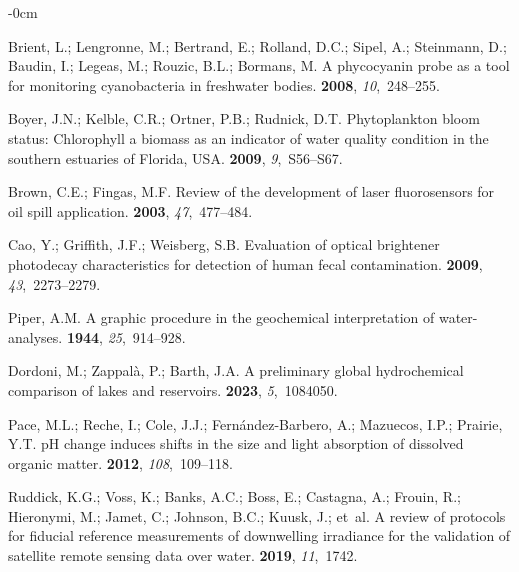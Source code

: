 \documentclass[remotesensing,article,accept,pdftex,moreauthors]{Definitions/mdpi}
\begin{document}
\begin{adjustwidth}{-\extralength}{0cm}
\begin{thebibliography}{999}
Brient, L.; Lengronne, M.; Bertrand, E.; Rolland, D.C.; Sipel, A.; Steinmann,
  D.; Baudin, I.; Legeas, M.; Rouzic, B.L.; Bormans, M.
\newblock A phycocyanin probe as a tool for monitoring cyanobacteria in
  freshwater bodies.
 {\bf 2008}, {\em 10},~248--255.

Boyer, J.N.; Kelble, C.R.; Ortner, P.B.; Rudnick, D.T.
\newblock Phytoplankton bloom status: Chlorophyll a biomass as an indicator of
  water quality condition in the southern estuaries of Florida, USA.
 {\bf 2009}, {\em 9},~S56--S67.

Brown, C.E.; Fingas, M.F.
\newblock Review of the development of laser fluorosensors for oil spill
  application.
 {\bf 2003}, {\em 47},~477--484.

Cao, Y.; Griffith, J.F.; Weisberg, S.B.
\newblock Evaluation of optical brightener photodecay characteristics for
  detection of human fecal contamination.
 {\bf 2009}, {\em 43},~2273--2279.

Piper, A.M.
\newblock A graphic procedure in the geochemical interpretation of
  water-analyses.
 {\bf 1944}, {\em
  25},~914--928.

Dordoni, M.; Zappal{\`a}, P.; Barth, J.A.
\newblock A preliminary global hydrochemical comparison of lakes and
  reservoirs.
 {\bf 2023}, {\em 5},~1084050.

Pace, M.L.; Reche, I.; Cole, J.J.; Fern{\'a}ndez-Barbero, A.; Mazuecos, I.P.;
  Prairie, Y.T.
\newblock pH change induces shifts in the size and light absorption of
  dissolved organic matter.
 {\bf 2012}, {\em 108},~109--118.

Ruddick, K.G.; Voss, K.; Banks, A.C.; Boss, E.; Castagna, A.; Frouin, R.;
  Hieronymi, M.; Jamet, C.; Johnson, B.C.; Kuusk, J.;  et~al.
\newblock A review of protocols for fiducial reference measurements of
  downwelling irradiance for the validation of satellite remote sensing data
  over water.
 {\bf 2019}, {\em 11},~1742.


\end{thebibliography}
\end{adjustwidth}
\end{document}
